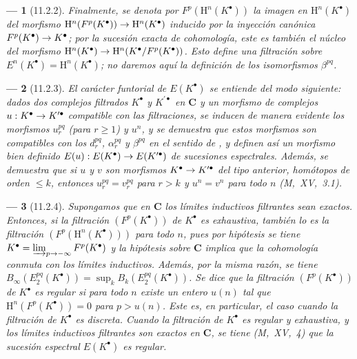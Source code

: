 \documentclass[10pt,oneside,openany]{book}
\theoremstyle{egaenv}\newtheorem*{env}{---}
\theoremstyle{egastatement}
\theoremstyle{egadescription}
\newcommand{\oldpage}[2][]{\marginnote{\normalfont\scriptsize\textbf{#1}\,|\,#2}\ignorespaces}
\renewcommand{\leq}{\leqslant}
\renewcommand{\geq}{\geqslant}
\renewcommand{\to}{\mathchoice{\longrightarrow}{\rightarrow}{\rightarrow}{\rightarrow}}
\begin{document}
\begin{env}[11.2.2]
Finalmente, se denota por $F^p(\mathrm H^n(K^\bullet))$ la imagen en $\mathrm H^n(K^\bullet)$ del morfismo $\mathrm H^n(F^p(K^\bullet))\to\mathrm H^n(K^\bullet)$ inducido por la inyección canónica $F^p(K^\bullet)\to K^\bullet$; por la sucesión exacta de cohomología, este es también el núcleo del morfismo $\mathrm H^n(K^\bullet)\to\mathrm H^n(K^\bullet/F^p(K^\bullet))$.
Esto define una filtración sobre $E^n(K^\bullet)=\mathrm H^n(K^\bullet)$; no daremos aquí la definición de los isomorfismos $\beta^{pq}$.
\end{env}

\begin{env}[11.2.3]
\label{0.11.2.3}
\label{0.11.2.3-fr}
El carácter \emph{funtorial} de $E(K^\bullet)$ se entiende del modo siguiente: dados dos complejos \emph{filtrados} $K^\bullet$ y $K^{\prime\bullet}$ en $\boldsymbol{C}$ y un morfismo de complejos $u:K^\bullet\to K^{\prime\bullet}$ \emph{compatible con las filtraciones}, se inducen de manera evidente los morfismos $u_r^{pq}$ (para $r\geq1$) y $u^n$, y se demuestra que estos morfismos son compatibles con los $d_r^{pq}$, $\alpha_r^{pq}$ y $\beta^{pq}$ en el sentido de , y definen así un morfismo bien definido $E(u):E(K^\bullet)\to E(K^{\prime\bullet})$ de sucesiones espectrales.
Además, se demuestra que si $u$ y $v$ son morfismos $K^\bullet\to K^{\prime\bullet}$ del tipo anterior, \emph{homótopos de orden $\leq k$}, entonces $u_r^{pq}=v_r^{pq}$ para $r>k$ y $u^n=v^n$ para todo $n$ (M,~XV,~3.1).
\end{env}

\begin{env}[11.2.4]
\label{0.11.2.4-fr}
\oldpage[0\textsubscript{III}]{29}
Supongamos que en $\boldsymbol{C}$ los límites inductivos filtrantes sean exactos. Entonces, si la filtración $(F^p(K^\bullet))$ de $K^\bullet$ es \emph{exhaustiva}, también lo es la filtración $(F^p(\mathrm H^n(K^\bullet)))$ para todo $n$, pues por hipótesis se tiene $K^\bullet=\varinjlim_{p\to-\infty}F^p(K^\bullet)$ y la hipótesis sobre $\boldsymbol{C}$ implica que la cohomología conmuta con los límites inductivos.
Además, por la misma razón, se tiene $B_\infty(E_2^{pq}(K^\bullet))=\sup_k B_k(E_2^{pq}(K^\bullet))$.
Se dice que la filtración $(F^p(K^\bullet))$ de $K^\bullet$ es \emph{regular} si para todo $n$ existe un entero $u(n)$ tal que $\mathrm H^n(F^p(K^\bullet))=0$ para $p>u(n)$.
Este es, en particular, el caso cuando la filtración de $K^\bullet$ es \emph{discreta}.
Cuando la filtración de $K^\bullet$ es regular y exhaustiva, y los límites inductivos filtrantes son exactos en $\boldsymbol{C}$, se tiene (M,~XV,~4) que la sucesión espectral $E(K^\bullet)$ es \emph{regular}.
\end{env}
\end{document}

